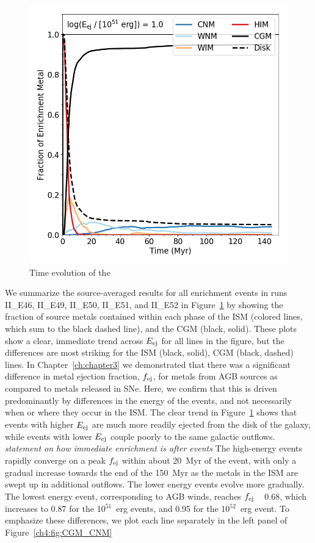 \begin{figure}
\includegraphics[width=0.45\linewidth]{figures/ch4/HNE1_enrichment_evolution_average_CGM}
\caption{Time evolution of the }
\label{ch4:fig:ISM_CGM}
\end{figure}

We summarize the source-averaged results for all enrichment events in runs II\_E46, II\_E49, II\_E50, II\_E51, and II\_E52 in Figure~\ref{ch4:fig:ISM_CGM} by showing the fraction of source metals contained within each phase of the ISM (colored lines, which sum to the black dashed line), and the CGM (black, solid). These plots show a clear, immediate trend across $E_{\rm ej}$ for all lines in the figure, but the differences are most striking for the ISM (black, solid), CGM (black, dashed) lines. In Chapter~\ref{ch:chapter3}
we demonstrated that there was a significant difference in metal ejection fraction, $f_{\rm ej}$, for metals from AGB sources as compared to metals released in SNe. Here, we confirm that this is driven predominantly by differences in the energy of the events, and not necessarily when or where they occur in the ISM. The clear trend in Figure~\ref{ch4:fig:ISM_CGM} shows that events with higher $E_{\rm ej}$ are much more readily ejected from the disk of the galaxy, while events with lower $E_{\rm ej}$ couple poorly to the same galactic outflows.
\textit{statement on how immediate enrichment is after events}
The high-energy events rapidly converge on a peak $f_{\rm ej}$ within about 20~Myr of the event, with only a gradual increase towards the end of the 150~Myr as the metals in the ISM are swept up in additional outflows. The lower energy events evolve more gradually. The lowest energy event, corresponding to AGB winds, reaches $f_{\rm ej}$ ~ 0.68, which increases to 0.87 for the 10$^{51}$~erg events, and 0.95 for the 10$^{52}$~erg event. To emphasize these differences, we plot each line separately in the left panel of Figure~\ref{ch4:fig:CGM_CNM}

